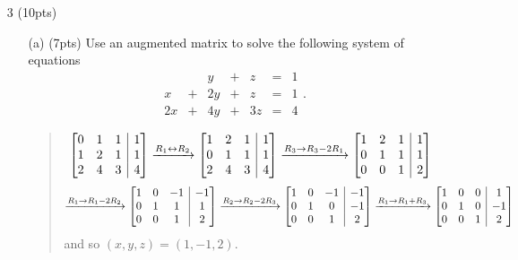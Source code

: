 \documentclass{article}
\makeatletter
\newenvironment{amatrix}[1]{%
  \left[\begin{array}{@{}*{#1}{c}|c@{}}
}{%
  \end{array}\right]
}
\makeatother
\begin{document}
\begin{enumerate}
	\item[3 (10pts)] $\phantom{xx}$
	\begin{enumerate}
		\item[(a) (7pts)]
		Use an augmented matrix to solve the following system of equations
		\[\begin{array}{rrrrrrc}
				&&   y &+&  z &   = & 1 \\
				x &   +&2y&+&  z &  = & 1 \\
				2x &  +& 4y&+&3 z  & = &  4 
		\end{array}.\]
		\begin{quote}
			\[
				\begin{amatrix}{3}
					0&1&1&1\\
					1&2&1&1\\
					2&4&3&4
				\end{amatrix}
				 \xrightarrow{R_1\leftrightarrow R_2}
				\begin{amatrix}{3}
					1&2&1&1\\
					0&1&1&1\\
					2&4&3&4
				\end{amatrix}
				 \xrightarrow{R_3\to R_3-2R_1}
				\begin{amatrix}{3}
					1&2&1&1\\
					0&1&1&1\\
					0&0&1&2
				\end{amatrix}
			\]
			\[
				 \xrightarrow{R_1\to R_1-2R_2}
				\begin{amatrix}{3}
					1&0&-1&-1\\
					0&1&1&1\\
					0&0&1&2
				\end{amatrix}
				 \xrightarrow{R_2\to R_2-2R_3}
				\begin{amatrix}{3}
					1&0&-1&-1\\
					0&1&0&-1\\
					0&0&1&2
				\end{amatrix}
				 \xrightarrow{R_1\to R_1+R_3}
				\begin{amatrix}{3}
					1&0&0&1\\
					0&1&0&-1\\
					0&0&1&2
				\end{amatrix}
			\]
			and so $(x,y,z)=(1,-1,2)$.
		\end{quote}

		\vspace{4in}


\end{enumerate}
\end{enumerate}
\end{document}
